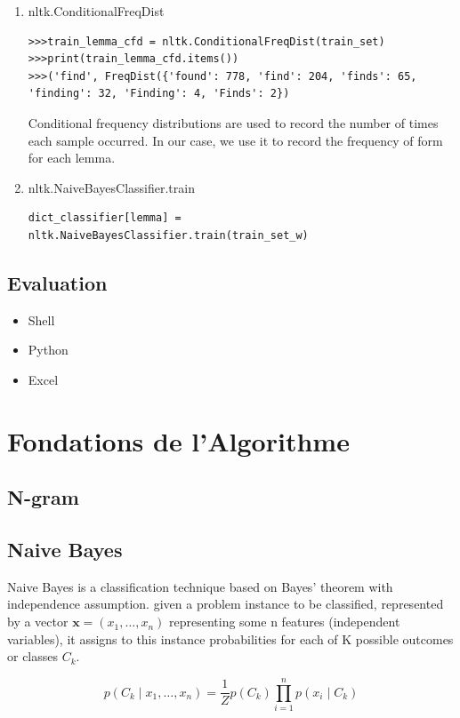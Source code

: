 \documentclass[a4paper]{article}
\begin{document}
\begin{enumerate}

\item nltk.ConditionalFreqDist
\begin{lstlisting}
>>>train_lemma_cfd = nltk.ConditionalFreqDist(train_set)
>>>print(train_lemma_cfd.items())
>>>('find', FreqDist({'found': 778, 'find': 204, 'finds': 65, 'finding': 32, 'Finding': 4, 'Finds': 2})
\end{lstlisting}
Conditional frequency distributions are used to record the number of times each sample occurred. In our case, we use it to record the frequency of form for each lemma. 

\item nltk.NaiveBayesClassifier.train
\begin{lstlisting}
dict_classifier[lemma] = nltk.NaiveBayesClassifier.train(train_set_w)
\end{lstlisting}
\end{enumerate}

\subsection{Evaluation} 
\begin{itemize}
\item Shell
\item Python
\item Excel
\end{itemize}

\section{Fondations de l’Algorithme}
\subsection{N-gram}

\subsection{Naive Bayes}
Naive Bayes is a classification technique based on Bayes' theorem with independence assumption.  given a problem instance to be classified, represented by a vector ${\mathbf  {x}}=(x_{1},\dots ,x_{n})$ representing some n features (independent variables), it assigns to this instance probabilities for each of K possible outcomes or classes $C_{k}$. \cite{murty_pattern_2011}

\[p(C_{k}\mid x_{1},\dots ,x_{n})={\frac {1}{Z}}p(C_{k})\prod _{i=1}^{n}p(x_{i}\mid C_{k})\]
\end{document}
